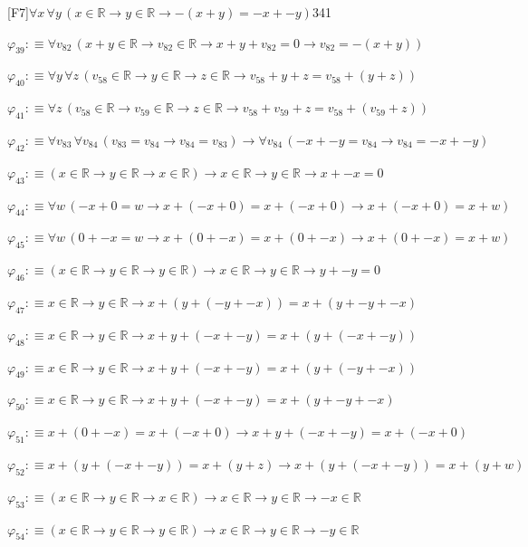 \begin{fullproof}{[F7]}{$\forall x\,\forall y\,(x \in \mathbb{R} \to y \in \mathbb{R} \to -(x + y) = -x + -y)$}{341}
\begin{abbrevlist}
\item $\varphi_{39} :\equiv \forall v_{82}\,(x + y \in \mathbb{R} \to v_{82} \in \mathbb{R} \to x + y + v_{82} = 0 \to v_{82} = -(x + y))$
\item $\varphi_{40} :\equiv \forall y\,\forall z\,(v_{58} \in \mathbb{R} \to y \in \mathbb{R} \to z \in \mathbb{R} \to v_{58} + y + z = v_{58} + (y + z))$
\item $\varphi_{41} :\equiv \forall z\,(v_{58} \in \mathbb{R} \to v_{59} \in \mathbb{R} \to z \in \mathbb{R} \to v_{58} + v_{59} + z = v_{58} + (v_{59} + z))$
\item $\varphi_{42} :\equiv \forall v_{83}\,\forall v_{84}\,(v_{83} = v_{84} \to v_{84} = v_{83}) \to \forall v_{84}\,(-x + -y = v_{84} \to v_{84} = -x + -y)$
\item $\varphi_{43} :\equiv (x \in \mathbb{R} \to y \in \mathbb{R} \to x \in \mathbb{R}) \to x \in \mathbb{R} \to y \in \mathbb{R} \to x + -x = 0$
\item $\varphi_{44} :\equiv \forall w\,(-x + 0 = w \to x + (-x + 0) = x + (-x + 0) \to x + (-x + 0) = x + w)$
\item $\varphi_{45} :\equiv \forall w\,(0 + -x = w \to x + (0 + -x) = x + (0 + -x) \to x + (0 + -x) = x + w)$
\item $\varphi_{46} :\equiv (x \in \mathbb{R} \to y \in \mathbb{R} \to y \in \mathbb{R}) \to x \in \mathbb{R} \to y \in \mathbb{R} \to y + -y = 0$
\item $\varphi_{47} :\equiv x \in \mathbb{R} \to y \in \mathbb{R} \to x + (y + (-y + -x)) = x + (y + -y + -x)$
\item $\varphi_{48} :\equiv x \in \mathbb{R} \to y \in \mathbb{R} \to x + y + (-x + -y) = x + (y + (-x + -y))$
\item $\varphi_{49} :\equiv x \in \mathbb{R} \to y \in \mathbb{R} \to x + y + (-x + -y) = x + (y + (-y + -x))$
\item $\varphi_{50} :\equiv x \in \mathbb{R} \to y \in \mathbb{R} \to x + y + (-x + -y) = x + (y + -y + -x)$
\item $\varphi_{51} :\equiv x + (0 + -x) = x + (-x + 0) \to x + y + (-x + -y) = x + (-x + 0)$
\item $\varphi_{52} :\equiv x + (y + (-x + -y)) = x + (y + z) \to x + (y + (-x + -y)) = x + (y + w)$
\item $\varphi_{53} :\equiv (x \in \mathbb{R} \to y \in \mathbb{R} \to x \in \mathbb{R}) \to x \in \mathbb{R} \to y \in \mathbb{R} \to -x \in \mathbb{R}$
\item $\varphi_{54} :\equiv (x \in \mathbb{R} \to y \in \mathbb{R} \to y \in \mathbb{R}) \to x \in \mathbb{R} \to y \in \mathbb{R} \to -y \in \mathbb{R}$

\end{abbrevlist}
\end{fullproof}

